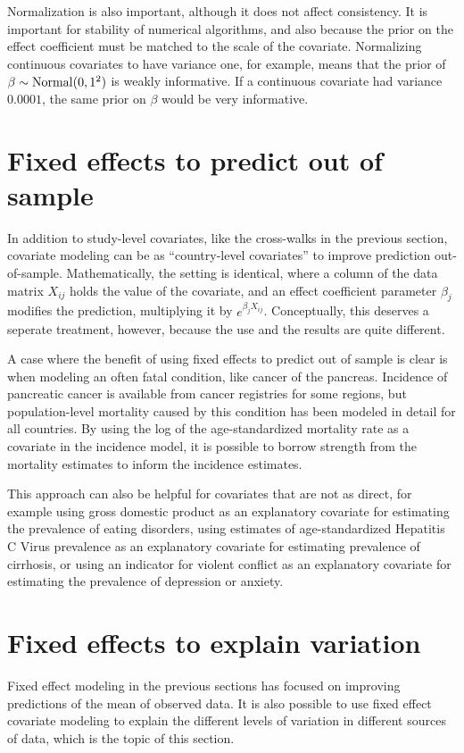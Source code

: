 Normalization is also important, although it does not affect
consistency.  It is important for stability of numerical algorithms,
and also because the prior on the effect coefficient must be matched
to the scale of the covariate.  Normalizing continuous covariates to
have variance one, for example, means that the prior of
$\beta\sim\operatorname{Normal}(0,1^2)$ is weakly informative.  If a continuous
covariate had variance $0.0001$, the same prior on $\beta$ would be
very informative.

\section{Fixed effects to predict out of sample}

In addition to study-level covariates, like the cross-walks in the
previous section, covariate modeling can be as ``country-level
covariates'' to improve prediction out-of-sample.  Mathematically, the
setting is identical, where a column of the data matrix $X_{ij}$ holds
the value of the covariate, and an effect coefficient parameter
$\beta_j$ modifies the prediction, multiplying it by
$e^{\beta_j X_{ij}}$.  Conceptually, this deserves a seperate treatment,
  however, because the use and the results are quite different.

A case where the benefit of using fixed effects to predict out of
sample is clear is when modeling an often fatal condition, like cancer
of the pancreas.  Incidence of pancreatic cancer is available from
cancer registries for some regions, but population-level mortality
caused by this condition has been modeled in detail for all
countries.  By using the log of the age-standardized mortality rate as a
covariate in the incidence model, it is possible to borrow strength
from the mortality estimates to inform the incidence estimates.

This approach can also be helpful for covariates that are not as
direct, for example using gross domestic product as an explanatory
covariate for estimating the prevalence of eating disorders, using
estimates of age-standardized Hepatitis C Virus prevalence as an
explanatory covariate for estimating prevalence of cirrhosis, or using
an indicator for violent conflict as an explanatory covariate for
estimating the prevalence of depression or anxiety.



\section{Fixed effects to explain variation}
Fixed effect modeling in the previous sections has focused on
improving predictions of the mean of observed data.  It is also
possible to use fixed effect covariate modeling to explain the
different levels of variation in different sources of data, which is
the topic of this section.

